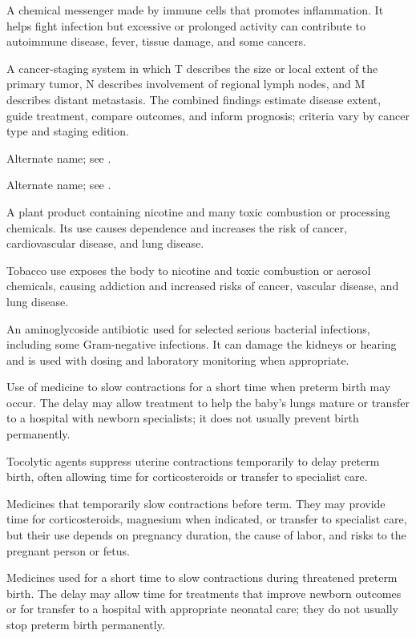  A chemical messenger made by immune cells that promotes inflammation. It helps fight infection but excessive or prolonged activity can contribute to autoimmune disease, fever, tissue damage, and some cancers.

 A cancer-staging system in which T describes the size or local extent of the primary tumor, N describes involvement of regional lymph nodes, and M describes distant metastasis. The combined findings estimate disease extent, guide treatment, compare outcomes, and inform prognosis; criteria vary by cancer type and staging edition.

 Alternate name; see .

 Alternate name; see .

 A plant product containing nicotine and many toxic combustion or processing chemicals. Its use causes dependence and increases the risk of cancer, cardiovascular disease, and lung disease.

 Tobacco use exposes the body to nicotine and toxic combustion or aerosol chemicals, causing addiction and increased risks of cancer, vascular disease, and lung disease.

 An aminoglycoside antibiotic used for selected serious bacterial infections, including some Gram-negative infections. It can damage the kidneys or hearing and is used with dosing and laboratory monitoring when appropriate.

 Use of medicine to slow contractions for a short time when preterm birth may occur. The delay may allow treatment to help the baby’s lungs mature or transfer to a hospital with newborn specialists; it does not usually prevent birth permanently.

 Tocolytic agents suppress uterine contractions temporarily to delay preterm birth, often allowing time for corticosteroids or transfer to specialist care.

 Medicines that temporarily slow contractions before term. They may provide time for corticosteroids, magnesium when indicated, or transfer to specialist care, but their use depends on pregnancy duration, the cause of labor, and risks to the pregnant person or fetus.

 Medicines used for a short time to slow contractions during threatened preterm birth. The delay may allow time for treatments that improve newborn outcomes or for transfer to a hospital with appropriate neonatal care; they do not usually stop preterm birth permanently.

